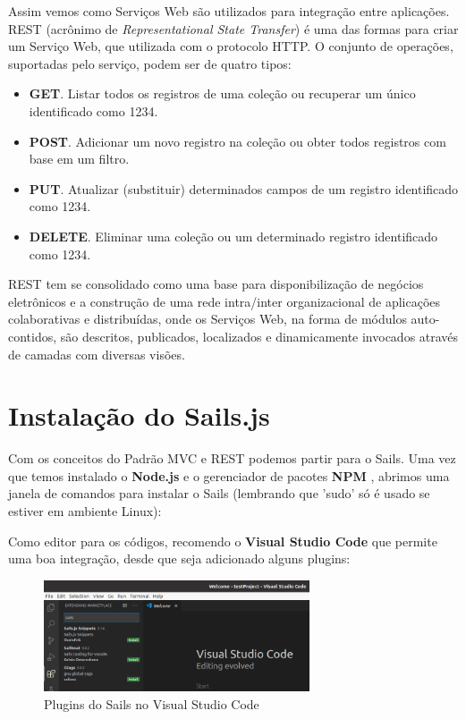\documentclass[a4paper,11pt]{article}
\begin{document}
Assim vemos como Serviços Web são utilizados para integração entre aplicações. REST (acrônimo de \textit{Representational State Transfer}) é uma das formas para criar um Serviço Web, que  utilizada com o protocolo HTTP. O conjunto de operações, suportadas pelo serviço, podem ser de quatro tipos: \vspace{-1em}
\begin{itemize}
  \item \textbf{GET}. Listar todos os registros de uma coleção ou recuperar um único identificado como 1234.
  \item \textbf{POST}. Adicionar um novo registro na coleção ou obter todos registros com base em um filtro.
  \item \textbf{PUT}. Atualizar (substituir) determinados campos de um registro identificado como 1234.
  \item \textbf{DELETE}. Eliminar uma coleção ou um determinado registro identificado como 1234.
\end{itemize}

REST tem se consolidado como uma base para disponibilização de negócios eletrônicos e a construção de uma rede intra/inter organizacional de aplicações colaborativas e distribuídas, onde os Serviços Web, na forma de módulos auto-contidos, são descritos, publicados, localizados e dinamicamente invocados através de camadas com diversas visões.

\section{Instalação do Sails.js}
Com os conceitos do Padrão MVC e REST podemos partir para o Sails. Uma vez que temos instalado o \textbf{Node.js} e o gerenciador de pacotes \textbf{NPM} \cite{npm}, abrimos uma janela de comandos para instalar o Sails (lembrando que 'sudo' só é usado se estiver em ambiente Linux): \\

Como editor para os códigos, recomendo o \textbf{Visual Studio Code} que permite uma boa integração, desde que seja adicionado alguns plugins:
\begin{figure}[H]
	\centering
	\includegraphics[width=0.7\textwidth]{imagens/VisualStudioCode.png}
	\caption{Plugins do Sails no Visual Studio Code}
\end{figure}
\end{document}
